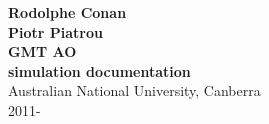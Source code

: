 \documentclass[10pt]{article}
\numberwithin{equation}{subsection}
\begin{document}
\begin{center}
	\vspace{5cm}
	\LARGE{\textbf{Rodolphe Conan \\ Piotr Piatrou}} \\
	\vspace{5cm}
	\Huge{\textbf{GMT AO \\ simulation documentation}} \\
	\vspace{13cm}
	\Large{Australian National University, Canberra \\ 2011-}
\end{center}

\newpage
\tableofcontents











\newpage
\printindex %
\end{document}
